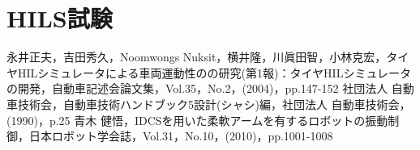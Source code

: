 \documentclass{article_vdlab_sotsuron_youshi}
\begin{document}
\section{HILS試験}

\begin{thebibliography}{99}
永井正夫，吉田秀久，Noomwongs Nuksit，横井隆，川眞田智，小林克宏，タイヤHILシミュレータによる車両運動性のの研究(第1報)：タイヤHILシミュレータの開発，自動車記述会論文集，Vol.35，No.2，(2004)，pp.147-152
社団法人 自動車技術会，自動車技術ハンドブック5設計(シャシ)編，社団法人 自動車技術会，(1990)，p.25
青木 健悟，IDCSを用いた柔軟アームを有するロボットの振動制御，日本ロボット学会誌，Vol.31，No.10，(2010)，pp.1001-1008
\end{thebibliography}
\end{document}
